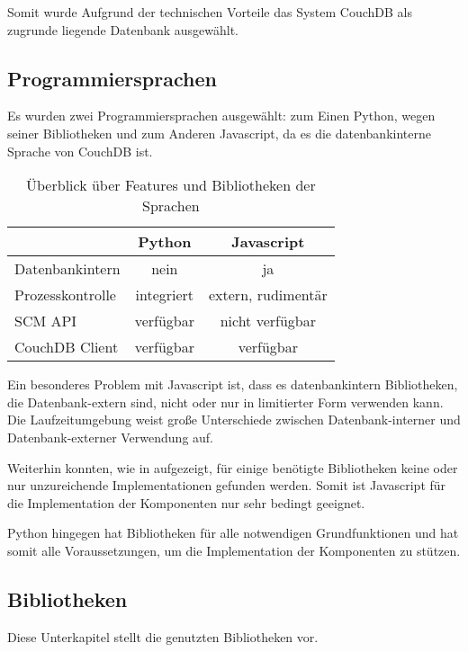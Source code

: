 Somit wurde Aufgrund der technischen Vorteile das System CouchDB als zugrunde liegende Datenbank ausgewählt.

\subsection{Programmiersprachen}

Es wurden zwei Programmiersprachen ausgew\"ahlt:
zum Einen Python, wegen seiner Bibliotheken und
zum Anderen Javascript, da es die datenbankinterne Sprache von CouchDB ist.

\begin{table}[ht]
\centering
\begin{tabular}{l|c|c}
                            & \textbf{Python} & \textbf{Javascript} \\
    \hline
    Datenbankintern         & nein            & ja \\
    Prozesskontrolle        & integriert      & extern, rudimentär \\
    SCM API                & verfügbar       & nicht verfügbar \\
    CouchDB Client          & verfügbar       & verfügbar \\
\end{tabular}
\caption{Überblick über Features und Bibliotheken der Sprachen}
\label{tab:python-vs-js}
\end{table}

Ein besonderes Problem mit Javascript ist,
dass es datenbankintern Bibliotheken, die Datenbank-extern sind,
nicht oder nur in limitierter Form verwenden kann.
Die Laufzeitumgebung weist große Unterschiede
zwischen Datenbank-interner und Datenbank-externer Verwendung auf.

Weiterhin konnten, wie in  aufgezeigt,
für einige benötigte Bibliotheken keine
oder nur unzureichende Implementationen gefunden werden.
Somit ist Javascript für die Implementation der Komponenten
nur sehr bedingt geeignet.

Python hingegen hat Bibliotheken für alle notwendigen Grundfunktionen
und hat somit alle Voraussetzungen,
um die Implementation der Komponenten zu stützen.

\subsection{Bibliotheken}

Diese Unterkapitel stellt die genutzten Bibliotheken vor.

